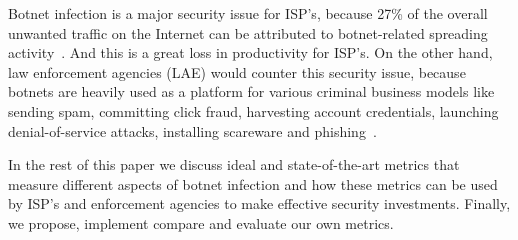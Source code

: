 Botnet infection is a major security issue for ISP's, because 27\% of the overall unwanted traffic on the Internet can be attributed to botnet-related spreading activity~\cite{AM2006}. And this is a great loss in productivity for ISP's. On the other hand, law enforcement agencies (LAE) would counter this security issue, because botnets are heavily used as a platform for various criminal business models like sending spam, committing click fraud, harvesting account credentials, launching denial-of-service attacks, installing scareware and phishing~\cite{AR2013}.

In the rest of this paper we discuss ideal and state-of-the-art metrics that measure different aspects of botnet infection and how these metrics can be used by ISP's and enforcement agencies to make effective security investments. Finally, we propose, implement compare and evaluate our own metrics.


